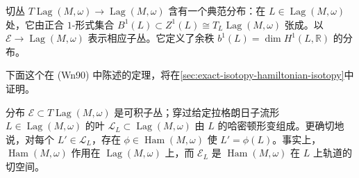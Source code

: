 切丛
$T\operatorname{Lag}(M,\omega)\to\operatorname{Lag}(M,\omega)$ 含有一个典范分布：在
$L\in\operatorname{Lag}(M,\omega)$ 处，它由正合 $1$-形式集合
$B^1(L)\subset Z^1(L)\cong T_L\operatorname{Lag}(M,\omega)$ 张成。以
$\mathcal E\to\operatorname{Lag}(M,\omega)$ 表示相应子丛。它定义了余秩
$b^1(L)=\dim H^1(L,\mathbb R)$ 的分布。

下面这个在 (Wn90) 中陈述的定理，将在\cref{sec:exact-isotopy-hamiltonian-isotopy}中证明。

\begin{theorem}\label{thm:hamiltonian-leaves}
分布 $\mathcal E\subset T\operatorname{Lag}(M,\omega)$ 是可积子丛；穿过给定拉格朗日子流形
$L\in\operatorname{Lag}(M,\omega)$ 的叶
$\mathcal L_L\subset\operatorname{Lag}(M,\omega)$ 由 $L$ 的哈密顿形变组成。更确切地说，对每个 $L'\in\mathcal L_L$，存在
$\phi\in\operatorname{Ham}(M,\omega)$ 使 $L'=\phi(L)$。事实上，
$\operatorname{Ham}(M,\omega)$ 作用在 $\operatorname{Lag}(M,\omega)$ 上，而
$\mathcal E_L$ 是 $\operatorname{Ham}(M,\omega)$ 在 $L$ 上轨道的切空间。
\end{theorem}
